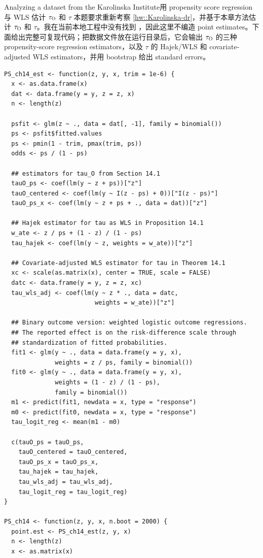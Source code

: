 \begin{exercisesolution}{Analyzing a dataset from the Karolinska Institute}{用 propensity score regression 与 WLS 估计 $\tau_\textsc{O}$ 和 $\tau$}
本题要求重新考察 \cref{hw::Karolinska-dr}，并基于本章方法估计 $\tau_\textsc{O}$ 和 $\tau$。我在当前本地工程中没有找到 ，因此这里不编造 point estimates。下面给出完整可复现代码；把数据文件放在运行目录后，它会输出 $\tau_\textsc{O}$ 的三种 propensity-score regression estimators，以及 $\tau$ 的 Hajek/WLS 和 covariate-adjusted WLS estimators，并用 bootstrap 给出 standard errors。

\begin{lstlisting}
PS_ch14_est <- function(z, y, x, trim = 1e-6) {
  x <- as.data.frame(x)
  dat <- data.frame(y = y, z = z, x)
  n <- length(z)

  psfit <- glm(z ~ ., data = dat[, -1], family = binomial())
  ps <- psfit$fitted.values
  ps <- pmin(1 - trim, pmax(trim, ps))
  odds <- ps / (1 - ps)

  ## estimators for tau_O from Section 14.1
  tauO_ps <- coef(lm(y ~ z + ps))["z"]
  tauO_centered <- coef(lm(y ~ I(z - ps) + 0))["I(z - ps)"]
  tauO_ps_x <- coef(lm(y ~ z + ps + ., data = dat))["z"]

  ## Hajek estimator for tau as WLS in Proposition 14.1
  w_ate <- z / ps + (1 - z) / (1 - ps)
  tau_hajek <- coef(lm(y ~ z, weights = w_ate))["z"]

  ## Covariate-adjusted WLS estimator for tau in Theorem 14.1
  xc <- scale(as.matrix(x), center = TRUE, scale = FALSE)
  datc <- data.frame(y = y, z = z, xc)
  tau_wls_adj <- coef(lm(y ~ z * ., data = datc,
                         weights = w_ate))["z"]

  ## Binary outcome version: weighted logistic outcome regressions.
  ## The reported effect is on the risk-difference scale through
  ## standardization of fitted probabilities.
  fit1 <- glm(y ~ ., data = data.frame(y = y, x),
              weights = z / ps, family = binomial())
  fit0 <- glm(y ~ ., data = data.frame(y = y, x),
              weights = (1 - z) / (1 - ps),
              family = binomial())
  m1 <- predict(fit1, newdata = x, type = "response")
  m0 <- predict(fit0, newdata = x, type = "response")
  tau_logit_reg <- mean(m1 - m0)

  c(tauO_ps = tauO_ps,
    tauO_centered = tauO_centered,
    tauO_ps_x = tauO_ps_x,
    tau_hajek = tau_hajek,
    tau_wls_adj = tau_wls_adj,
    tau_logit_reg = tau_logit_reg)
}

PS_ch14 <- function(z, y, x, n.boot = 2000) {
  point.est <- PS_ch14_est(z, y, x)
  n <- length(z)
  x <- as.matrix(x)


\end{lstlisting}
\end{exercisesolution}
